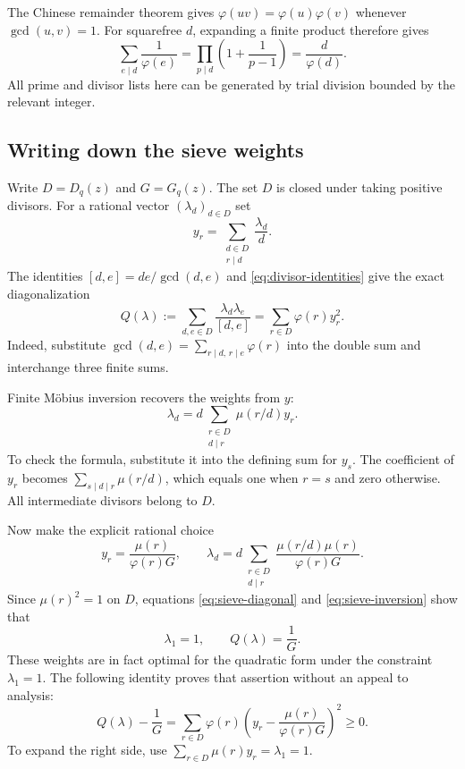 The Chinese remainder theorem gives
$\varphi(uv)=\varphi(u)\varphi(v)$ whenever $\gcd(u,v)=1$.
For squarefree $d$, expanding a finite product therefore gives
\begin{equation}
 \sum_{e\mid d}\frac1{\varphi(e)}
 =\prod_{p\mid d}\left(1+\frac1{p-1}\right)
 =\frac d{\varphi(d)}.
 \label{eq:phi-inverse-divisors}
\end{equation}
All prime and divisor lists here can be generated by trial division
bounded by the relevant integer.

\subsection{Writing down the sieve weights}

Write $D=D_q(z)$ and $G=G_q(z)$.  The set $D$ is closed under taking
positive divisors.  For a rational vector $(\lambda_d)_{d\in D}$ set
\[
 y_r=\sum_{\substack{d\in D\\r\mid d}}\frac{\lambda_d}{d}.
\]
The identities $[d,e]=de/\gcd(d,e)$ and
\eqref{eq:divisor-identities} give the exact diagonalization
\begin{equation}
 Q(\lambda):=\sum_{d,e\in D}\frac{\lambda_d\lambda_e}{[d,e]}
 =\sum_{r\in D}\varphi(r)y_r^2.
 \label{eq:sieve-diagonal}
\end{equation}
Indeed, substitute
$\gcd(d,e)=\sum_{r\mid d,\,r\mid e}\varphi(r)$ into the double sum and
interchange three finite sums.

Finite M\"obius inversion recovers the weights from $y$:
\begin{equation}
 \lambda_d=d\sum_{\substack{r\in D\\d\mid r}}\mu(r/d)y_r.
 \label{eq:sieve-inversion}
\end{equation}
To check the formula, substitute it into the defining sum for $y_s$.
The coefficient of $y_r$ becomes
$\sum_{s\mid d\mid r}\mu(r/d)$, which equals one when $r=s$ and zero
otherwise.  All intermediate divisors belong to $D$.

Now make the explicit rational choice
\begin{equation}
 y_r=\frac{\mu(r)}{\varphi(r)G},
 \qquad
 \lambda_d=d\sum_{\substack{r\in D\\d\mid r}}
               \frac{\mu(r/d)\mu(r)}{\varphi(r)G}.
 \label{eq:explicit-sieve-weights}
\end{equation}
Since $\mu(r)^2=1$ on $D$, equations
\eqref{eq:sieve-diagonal} and \eqref{eq:sieve-inversion} show that
\begin{equation}
 \lambda_1=1,\qquad Q(\lambda)=\frac1G.
 \label{eq:sieve-normalization}
\end{equation}
These weights are in fact optimal for the quadratic form under the
constraint $\lambda_1=1$.  The following identity proves that assertion
without an appeal to analysis:
\[
 Q(\lambda)-\frac1G=
 \sum_{r\in D}\varphi(r)
 \left(y_r-\frac{\mu(r)}{\varphi(r)G}\right)^2\geq0.
\]
To expand the right side, use
$\sum_{r\in D}\mu(r)y_r=\lambda_1=1$.


